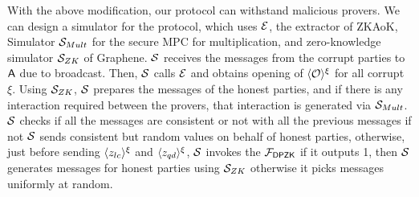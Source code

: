With the above modification, our protocol can withstand malicious provers. We can design a simulator for the protocol, which uses $\mathcal{E}$, the extractor of ZKAoK, Simulator $\mathcal{S}_{Mult}$ for the secure MPC for multiplication, and zero-knowledge simulator $\mathcal{S}_{ZK}$ of Graphene. 
$\mathcal{S}$ receives the messages from the corrupt parties to $\mathsf{A}$ due to broadcast. Then, $\mathcal{S}$ calls $\mathcal{E}$ and obtains opening of $\langle{\mathcal{O}}\rangle^\xi$ for all corrupt $\xi$. Using $\mathcal{S}_{ZK}$, $\mathcal{S}$ prepares the messages of the honest parties, and if there is any interaction required between the provers, that interaction is generated via $\mathcal{S}_{Mult}$. $\mathcal{S}$ checks if all the messages are consistent or not with all the previous messages if not $\mathcal{S}$ sends consistent but random values on behalf of honest parties, otherwise, just before sending $\langle{z_{lc}}\rangle^\xi$ and $\langle{z_{qd}}\rangle^\xi$, $\mathcal{S}$ invokes the $\mathcal{F}_{\mathsf{DPZK}}$ if it outputs 1, then $\mathcal{S}$ generates messages for honest parties using $\mathcal{S}_{ZK}$ otherwise it picks messages uniformly at random.

